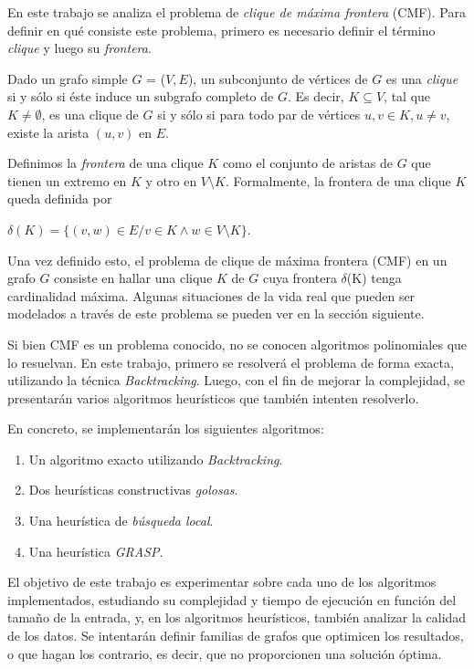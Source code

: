 En este trabajo se analiza el problema de \textit{clique de máxima frontera} (CMF). Para definir en qué consiste este problema, primero es necesario definir el término \textit{clique} y luego su \textit{frontera}.

Dado un grafo simple $G$ = ($V, E$), un subconjunto de vértices de $G$ es una \textit{clique} si y sólo si éste induce
un subgrafo completo de $G$. Es decir, $K \subseteq V$, tal que $K \neq \emptyset$, es una clique de $G$ si y sólo si para todo
par de vértices $u, v \in K, u \neq v$, existe la arista $(u,v)$ en $E$.

Definimos la \textit{frontera} de una clique $K$ como el
conjunto de aristas de $G$ que tienen un extremo en $K$ y otro en $V \setminus K$. Formalmente, la frontera de una
clique $K$ queda definida por

$\delta(K) = \lbrace (v,w) \in E / v \in K \wedge w \in V \setminus K \rbrace$.

Una vez definido esto, el problema de clique de máxima frontera (CMF) en un grafo $G$ consiste en hallar una clique $K$ de $G$ cuya frontera $\delta$(K) tenga cardinalidad máxima. Algunas situaciones de la vida real que pueden ser modelados a través de este problema se pueden ver en la sección siguiente.

Si bien CMF es un problema conocido, no se conocen algoritmos polinomiales que lo resuelvan. En este trabajo, primero se resolverá el problema de forma exacta, utilizando la técnica \textit{Backtracking}. Luego, con el fin de mejorar la complejidad, se presentarán varios algoritmos heurísticos que también intenten resolverlo.

En concreto, se implementarán los siguientes algoritmos:

\begin{enumerate}
\item Un algoritmo exacto utilizando \textit{Backtracking}.
\item Dos heurísticas constructivas \textit{golosas}.
\item Una heurística de \textit{búsqueda local}.
\item Una heurística \textit{GRASP}.
\end{enumerate}

El objetivo de este trabajo es experimentar sobre cada uno de los algoritmos implementados, estudiando su complejidad y tiempo de ejecución en función del tamaño de la entrada, y, en los algoritmos heurísticos, también analizar la calidad de los datos. Se intentarán definir familias de grafos que optimicen los resultados, o que hagan los contrario, es decir, que no proporcionen una solución óptima. 